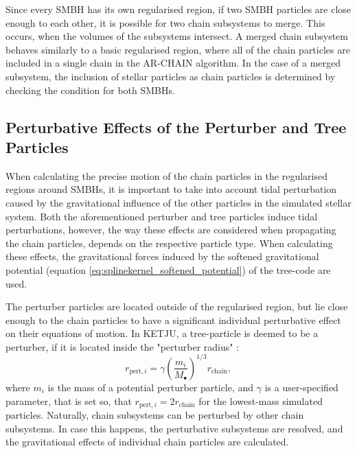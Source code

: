 \documentclass[english, twoside]{HYgradu}
\begin{document}
Since every SMBH has its own regularised region, if two SMBH particles are close enough to each other, it is possible for two chain subsystems to merge. This occurs, when the volumes of the subsystems intersect. A merged chain subsystem behaves similarly to a basic regularised region, where all of the chain particles are included in a single chain in the AR-CHAIN algorithm. In the case of a merged subsystem, the inclusion of stellar particles as chain particles is determined by checking the condition for both SMBHs.

\subsection{Perturbative Effects of the Perturber and Tree Particles}

When calculating the precise motion of the chain particles in the regularised regions around SMBHs, it is important to take into account tidal perturbation caused by the gravitational influence of the other particles in the simulated stellar system. Both the aforementioned perturber and tree particles induce tidal perturbations, however, the way these effects are considered when propagating the chain particles, depends on the respective particle type. When calculating these effects, the gravitational forces induced by the softened gravitational potential (equation \ref{eq:splinekernel_softened_potential}) of the tree-code are used.

The perturber particles are located outside of the regularised region, but lie close enough to the chain particles to have a significant individual perturbative effect on their equations of motion. In KETJU, a tree-particle is deemed to be a perturber, if it is located inside the "perturber radius" \citep{Rantala2017KETJU}:
\begin{equation}
r_{\mathrm{pert},i} = \gamma \left( \frac{m_i}{M_\bullet} \right)^{1/3} r_\mathrm{chain},
\end{equation}
where $m_i$ is the mass of a potential perturber particle, and $\gamma$ is a user-specified parameter, that is set so, that $r_{\mathrm{pert},i} = 2r_\mathrm{chain}$ for the lowest-mass simulated particles. Naturally, chain subsystems can be perturbed by other chain subsystems. In case this happens, the perturbative subsystems are resolved, and the gravitational effects of individual chain particles are calculated.
\end{document}
